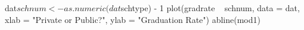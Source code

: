 \begin{Schunk}
\begin{Sinput}
 dat$schnum <- as.numeric(dat$schtype) - 1
 plot(gradrate ~ schnum, data = dat, xlab = "Private or Public?", ylab = "Graduation Rate")
 abline(mod1)
\end{Sinput}
\end{Schunk}
